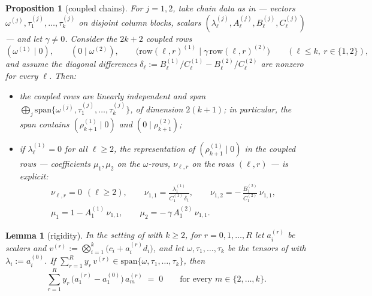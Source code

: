\documentclass{article}
\newtheorem{lemma}[theorem]{Lemma}
\newtheorem{proposition}[theorem]{Proposition}
\theoremstyle{definition}
\begin{document}
\begin{proposition}[coupled chains]\label{lem:coupled}
For $j = 1, 2$, take chain data as in  --- vectors $\omega^{(j)}, \tau^{(j)}_1, \dots, \tau^{(j)}_k$ on disjoint column blocks, scalars $(\lambda^{(j)}_\ell, A^{(j)}_\ell, B^{(j)}_\ell, C^{(j)}_\ell)$ --- and let $\gamma \neq 0$. Consider the $2k + 2$ \emph{coupled rows}
\[
(\omega^{(1)} \mid 0) , \qquad (0 \mid \omega^{(2)}) , \qquad \big(\mathrm{row}(\ell, r)^{(1)} \;\big|\; \gamma\, \mathrm{row}(\ell, r)^{(2)}\big) \qquad (\ell \leq k,\ r \in \{1, 2\}) ,
\]
and assume the \emph{diagonal differences} $\delta_\ell := B^{(1)}_\ell / C^{(1)}_\ell - B^{(2)}_\ell / C^{(2)}_\ell$ are nonzero for every $\ell$. Then:
\begin{itemize}
\item[(i)] the coupled rows are linearly independent and span $\bigoplus_{j} \mathrm{span}\{\omega^{(j)}, \tau^{(j)}_1, \dots, \tau^{(j)}_k\}$, of dimension $2(k+1)$; in particular, the span contains $(\rho^{(1)}_{k+1} \mid 0)$ and $(0 \mid \rho^{(2)}_{k+1})$;
\item[(ii)] if $\lambda^{(1)}_\ell = 0$ for all $\ell \geq 2$, the representation of $(\rho^{(1)}_{k+1} \mid 0)$ in the coupled rows --- coefficients $\mu_1, \mu_2$ on the $\omega$-rows, $\nu_{\ell, r}$ on the rows $(\ell, r)$ --- is explicit:
\[
\begin{gathered}
\nu_{\ell, r} = 0 \ \ (\ell \geq 2) , \qquad \nu_{1,1} = \frac{\lambda^{(1)}_1}{C^{(1)}_1\, \delta_1} , \qquad \nu_{1,2} = -\,\frac{B^{(2)}_1}{C^{(2)}_1}\, \nu_{1,1} , \\
\mu_1 = 1 - A^{(1)}_1\, \nu_{1,1} , \qquad \mu_2 = -\,\gamma\, A^{(2)}_1\, \nu_{1,1} .
\end{gathered}
\]
\end{itemize}
\end{proposition}

\begin{lemma}[rigidity]\label{lem:rigidity}
In the setting of  with $k \geq 2$, for $r = 0, 1, \dots, R$ let $a^{(r)}_i$ be scalars and $v^{(r)} := \bigotimes_{i=1}^{k} \big(c_i + a^{(r)}_i d_i\big)$, and let $\omega, \tau_1, \dots, \tau_k$ be the tensors of  with $\lambda_i := a^{(0)}_i$. If $\sum_{r=1}^{R} y_r\, v^{(r)} \in \mathrm{span}\{\omega, \tau_1, \dots, \tau_k\}$, then
\[
\sum_{r=1}^{R} y_r\, \big(a^{(r)}_1 - a^{(0)}_1\big)\, a^{(r)}_m \;=\; 0 \qquad \text{for every } m \in \{2, \dots, k\} .
\]
\end{lemma}
\end{document}
